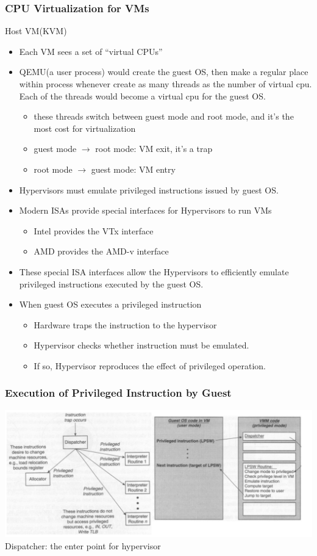 \documentclass[12pt]{article}
\begin{document}
\subsubsection{CPU Virtualization for VMs}
Host VM(KVM)
\begin{itemize}
    \item Each VM sees a set of “virtual CPUs”
    \item QEMU(a user process) would create the guest OS, then make a regular place within process whenever create as many threads as the number of virtual cpu. Each of the threads would become a virtual cpu for the guest OS. \begin{itemize}
        \item these threads switch between guest mode and root mode, and it's the most cost for virtualization
        \item guest mode $\rightarrow$ root mode: VM exit, it's a trap
        \item root mode $\rightarrow$ guest mode: VM entry
    \end{itemize}
    \item Hypervisors must emulate privileged instructions issued by guest OS.
    \item Modern ISAs provide special interfaces for Hypervisors to run VMs \begin{itemize}
        \item Intel provides the VTx interface
        \item AMD provides the AMD-v interface
    \end{itemize}
    \item These special ISA interfaces allow the Hypervisors to efficiently emulate privileged instructions executed by the guest OS.
    \item When guest OS executes a privileged instruction \begin{itemize}
        \item Hardware traps the instruction to the hypervisor
        \item Hypervisor checks whether instruction must be emulated.
        \item If so, Hypervisor reproduces the effect of privileged operation.
    \end{itemize}
\end{itemize}
\subsubsection{Execution of Privileged Instruction by Guest}
\includegraphics[width=\textwidth]{ExecutionOfPrivilegedInstructionbyGuest.png}
Dispatcher:  the enter point for hypervisor
\end{document}
